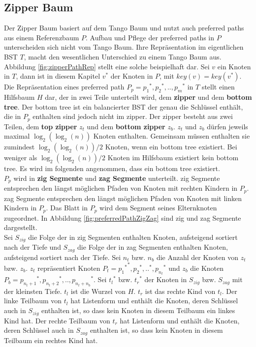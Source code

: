 \documentclass[a4paper,12pt]{article}
\begin{document}
\subsection{Zipper Baum}
Der Zipper Baum basiert auf dem Tango Baum und nutzt auch preferred paths aus einem Referenzbaum $P$. Aufbau und Pflege der preferred paths in $P$ unterscheiden sich nicht vom Tango Baum.  Ihre Repräsentation im eigentlichen BST $T$, macht den wesentlichen Unterschied zu einem Tango Baum aus. Abbildung \ref{fig:zipperPathRep} stellt eine solche beispielhaft dar.  Sei $v$ ein Knoten in $T$, dann ist in diesem Kapitel $v^*$ der Knoten in $P$, mit $\mathit{key}\left(v\right) =\mathit{key}\left(v^*\right)$. Die Repräsentation eines preferred path  $P_p = {p_1}^*,{p_2}^*,..,{p_m}^*$ in $T$ stellt einen Hilfsbaum $H$ dar, der in zwei Teile unterteilt wird, dem \textbf{zipper} und dem \textbf{bottom tree}.  Der bottom tree ist ein balancierter BST der genau die Schlüssel enthält, die in $P_p$ enthalten sind jedoch nicht im zipper. Der zipper besteht aus zwei Teilen, dem \textbf{top zipper} $z_t$ und dem \textbf{bottom zipper} $z_b$. $z_t$ und $z_b$ dürfen jeweils maximal $\log_2\left(\log_2\left(n\right)\right)$ Knoten enthalten. Gemeinsam müssen enthalten sie zumindest $\log_2\left(\log_2\left(n\right)\right) / 2$ Knoten, wenn ein bottom tree existiert. Bei weniger als $\log_2\left(\log_2\left(n\right)\right) / 2$ Knoten im Hilfsbaum existiert kein bottom tree. Es wird im folgenden angenommen, dass ein bottom tree existiert. \\
$P_p$ wird in \textbf{zig Segmente} und \textbf{zag Segmente} unterteilt. zig Segmente entsprechen den längst möglichen Pfaden von Knoten mit rechten Kindern in $P_p$. zag Segmente entsprechen den längst möglichen Pfaden von Knoten mit linken Kindern in $P_p$. Das Blatt in $P_p$ wird dem Segment seines Elternknoten zugeordnet. In Abbildung  \ref{fig:preferredPathZigZag} sind zig und zag Segmente dargestellt.\\
Sei $S_{zig}$ die Folge der in zig Segmenten enthalten Knoten, aufsteigend sortiert nach der Tiefe und $S_{zag}$ die Folge der in zag Segmenten enthalten Knoten, aufsteigend sortiert nach der Tiefe.  Sei $n_t$ bzw. $n_b$ die Anzahl der Knoten von $z_t$ bzw. $z_b$. $z_t$ repräsentiert Knoten  $P_t = {p_1{}^*}^*,{p_2}^*{,..}^*,{p_{n_t}}^*$ und $z_b$ die Knoten  $P_b = {p_{n_t + 1}}^*,{p_{n_t + 2}}^*,..,{p_{n_t + n_b}}^*$.
Sei ${t_l}^*$ bzw. ${t_r}^*$ der Knoten in $S_{zig}$ bzw. $S_{zag}$ mit der kleinsten Tiefe. $t_l$ ist die Wurzel von $H$. $t_r$ ist das rechte Kind von $t_l$. Der linke Teilbaum von $t_l$  hat Listenform und  enthält die  Knoten, deren Schlüssel auch in  $S_{zig}$ enthalten ist, so dass kein Knoten in diesem Teilbaum ein linkes Kind hat. Der rechte Teilbaum von $t_r$  hat Listenform und  enthält die  Knoten, deren Schlüssel auch in $S_{zag}$ enthalten ist, so dass kein Knoten in diesem Teilbaum ein rechtes Kind hat. \\
\end{document}
